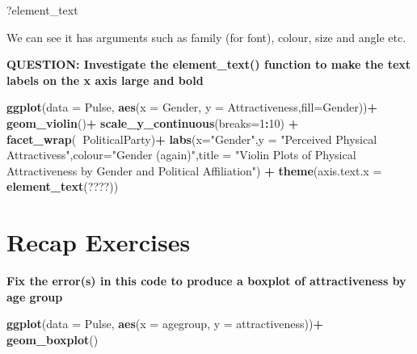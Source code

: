 \documentclass[]{book}
\newenvironment{Shaded}{\begin{snugshade}}{\end{snugshade}}
\newcommand{\DataTypeTok}[1]{\textcolor[rgb]{0.13,0.29,0.53}{#1}}
\newcommand{\DecValTok}[1]{\textcolor[rgb]{0.00,0.00,0.81}{#1}}
\newcommand{\KeywordTok}[1]{\textcolor[rgb]{0.13,0.29,0.53}{\textbf{#1}}}
\newcommand{\NormalTok}[1]{#1}
\newcommand{\OperatorTok}[1]{\textcolor[rgb]{0.81,0.36,0.00}{\textbf{#1}}}
\newcommand{\StringTok}[1]{\textcolor[rgb]{0.31,0.60,0.02}{#1}}
\begin{document}
\begin{Shaded}
\begin{Highlighting}[]
\NormalTok{?element_text}
\end{Highlighting}
\end{Shaded}

We can see it has arguments such as family (for font), colour, size and angle etc.

\textbf{QUESTION: Investigate the element\_text() function to make the text labels on the x axis large and bold}

\begin{Shaded}
\begin{Highlighting}[]
\KeywordTok{ggplot}\NormalTok{(}\DataTypeTok{data =}\NormalTok{ Pulse,  }\KeywordTok{aes}\NormalTok{(}\DataTypeTok{x =}\NormalTok{ Gender, }\DataTypeTok{y =}\NormalTok{ Attractiveness,}\DataTypeTok{fill=}\NormalTok{Gender))}\OperatorTok{+}
\StringTok{  }\KeywordTok{geom_violin}\NormalTok{()}\OperatorTok{+}
\StringTok{    }\KeywordTok{scale_y_continuous}\NormalTok{(}\DataTypeTok{breaks=}\DecValTok{1}\OperatorTok{:}\DecValTok{10}\NormalTok{) }\OperatorTok{+}
\StringTok{     }\KeywordTok{facet_wrap}\NormalTok{(}\OperatorTok{~}\NormalTok{PoliticalParty)}\OperatorTok{+}
\StringTok{      }\KeywordTok{labs}\NormalTok{(}\DataTypeTok{x=}\StringTok{"Gender"}\NormalTok{,}\DataTypeTok{y =} \StringTok{"Perceived Physical Attractivess"}\NormalTok{,}\DataTypeTok{colour=}\StringTok{"Gender (again)"}\NormalTok{,}\DataTypeTok{title =} \StringTok{"Violin Plots of Physical Attractiveness by Gender and Political   Affiliation"}\NormalTok{) }\OperatorTok{+}\StringTok{ }
\StringTok{       }\KeywordTok{theme}\NormalTok{(}\DataTypeTok{axis.text.x =} \KeywordTok{element_text}\NormalTok{(????))}
\end{Highlighting}
\end{Shaded}

\hypertarget{recap-exercises}{%
\section{Recap Exercises}\label{recap-exercises}}

\textbf{Fix the error(s) in this code to produce a boxplot of attractiveness by age group}

\begin{Shaded}
\begin{Highlighting}[]
\KeywordTok{ggplot}\NormalTok{(}\DataTypeTok{data =}\NormalTok{ Pulse,  }\KeywordTok{aes}\NormalTok{(}\DataTypeTok{x =}\NormalTok{ agegroup, }\DataTypeTok{y =}\NormalTok{ attractiveness))}\OperatorTok{+}
\StringTok{  }\KeywordTok{geom_boxplot}\NormalTok{()}
\end{Highlighting}
\end{Shaded}
\end{document}
